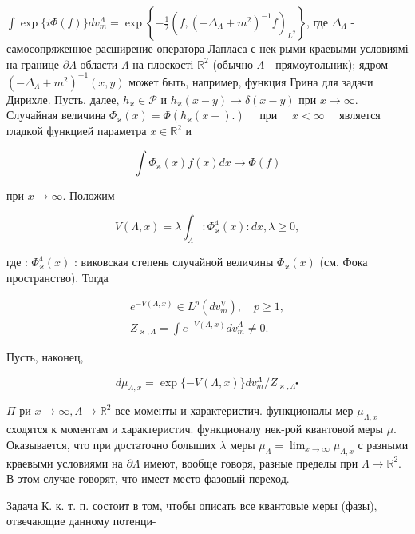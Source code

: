 \documentclass[10pt]{article}
\begin{document}
$\int \exp \{i \Phi(f)\} d v_{m}^{\Lambda}=\exp \left\{-\frac{1}{2}\left(f,\left(-\Delta_{\Lambda}+m^{2}\right)^{-1} f\right)_{L^{2}}\right\}$, где $\Delta_{\Lambda}$ - самосопряженное расширение оператора Лапласа с нек-рыми краевыми условиямі на границе $\partial \Lambda$ области $\Lambda$ на плоскості $\mathbb{R}^{2}$ (обычно $\Lambda$ - прямоугольник); ядром $\left(-\Delta_{\Lambda}+m^{2}\right)^{-1}(x, y)$ может быть, например, функция Грина для задачи Дирихле. Пусть, далее, $h_{\varkappa} \in \mathscr{P}$ и $h_{\varkappa}(x-y) \rightarrow \delta(x-y)$ при $x \rightarrow \infty$. Случайная величина $\Phi_{\varkappa}(x)=\Phi\left(h_{\varkappa}(x-).\right) \quad$ при $\quad x<\infty \quad$ является гладкой функцией параметра $x \in \mathbb{R}^{2}$ и



\[

\int \Phi_{\varkappa}(x) f(x) d x \rightarrow \Phi(f)

\]



при $x \rightarrow \infty$. Положим



\[

V(\Lambda, x)=\lambda \int_{\Lambda}: \Phi_{\varkappa}^{4}(x): d x, \lambda \geqslant 0,

\]



где : $\Phi_{\varkappa}^{4}(x)$ : виковская степень случайной величины $\Phi_{\varkappa}(x)$ (см. Фока пространство). Тогда



\[

\begin{gathered}

e^{-V(\Lambda, x)} \in L^{p}\left(d v_{m}^{\mathrm{V}}\right), \quad p \geqslant 1, \\

Z_{\varkappa, \Lambda}=\int e^{-V(\Lambda, x)} d v_{m}^{\Lambda} \neq 0 .

\end{gathered}

\]



Пусть, наконец,



\[

d \mu_{\Lambda, x}=\exp \{-V(\Lambda, x)\} d v_{m}^{\Lambda} / Z_{\varkappa, \Lambda^{\bullet}}

\]



$\Pi$ ри $x \rightarrow \infty, \Lambda \rightarrow \mathbb{R}^{2}$ все моменты и характеристич. функционалы мер $\mu_{\Lambda, x}$ сходятся к моментам и характеристич. функционалу нек-рой квантовой меры $\mu$. Оказывается, что при достаточно болыших $\lambda$ меры $\mu_{\Lambda}=\lim _{x \rightarrow \infty} \mu_{\Lambda, x}$ с разными краевыми условиями на $\partial \Lambda$ имеют, вообще говоря, разные пределы при $\Lambda \rightarrow \mathbb{R}^{2}$. В этом случае говорят, что имеет место фазовый переход.



Задача К. к. т. п. состоит в том, чтобы описать все квантовые меры (фазы), отвечающие данному потенци-
\end{document}
